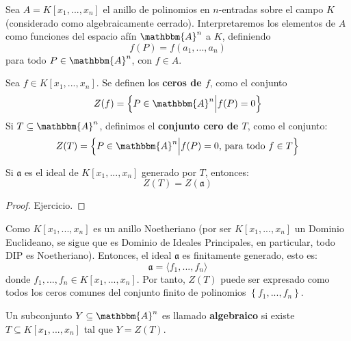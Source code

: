 \documentclass[12pt]{report}
\theoremstyle{largebreak}
\newcommand{\bbm}[1]{\ensuremath{\mathbbm{#1}}}
\newcommand{\fk}[1]{\ensuremath{\mathfrak{#1}}}
\newcommand{\gen}[1]{\ensuremath{\langle#1\rangle}}
\begin{document}
    Sea $A=K[x_1,...,x_n]$ el anillo de polinomios en $n$-entradas sobre el campo $K$ (considerado como algebraicamente cerrado). Interpretaremos los elementos de $A$ como funciones del espacio afín $\bbm{A}^n$ a $K$, definiendo
    \begin{equation*}
        f(P)=f(a_1,...,a_n)
    \end{equation*}
    para todo $P\in\bbm{A}^n$, con $f\in A$.

    \begin{mydef}
        Sea $f\in K[x_1,...,x_n]$. Se definen los \textbf{ceros de $f$}, como el conjunto
        \begin{equation*}
            Z(f)=\left\{P\in\bbm{A}^n\Big|f(P)=0 \right\}
        \end{equation*}
        Si $T\subseteq\bbm{A}^n$, definimos el \textbf{conjunto cero de $T$}, como el conjunto:
        \begin{equation*}
            Z(T)=\left\{P\in\bbm{A}^n\Big|f(P)=0\textup{, para todo }f\in T \right\}
        \end{equation*}
    \end{mydef}

    \begin{propo}
        Si $\fk{a}$ es el ideal de $K[x_1,...,x_n]$ generado por $T$, entonces:
        \begin{equation*}
            Z(T)=Z(\fk{a})
        \end{equation*}
    \end{propo}

    \begin{proof}
        Ejercicio.
    \end{proof}

    \begin{obs}
        Como $K[x_1,...,x_n]$ es un anillo Noetheriano (por ser $K[x_1,...,x_n]$ un Dominio Euclideano, se sigue que es Dominio de Ideales Principales, en particular, todo DIP es Noetheriano). Entonces, el ideal $\fk{a}$ es finitamente generado, esto es:
        \begin{equation*}
            \fk{a}=\gen{f_1,...,f_n}
        \end{equation*}
        donde $f_1,...,f_n\in K[x_1,...,x_n]$. Por tanto, $Z(T)$ puede ser expresado como todos los ceros comunes del conjunto finito de polinomios $\left\{f_1,...,f_n \right\}$.
    \end{obs}

    \begin{mydef}
        Un subconjunto $Y\subseteq\bbm{A}^n$ es llamado \textbf{algebraico} si existe $T\subseteq K[x_1,...,x_n]$ tal que $Y=Z(T)$.
    \end{mydef}
\end{document}
